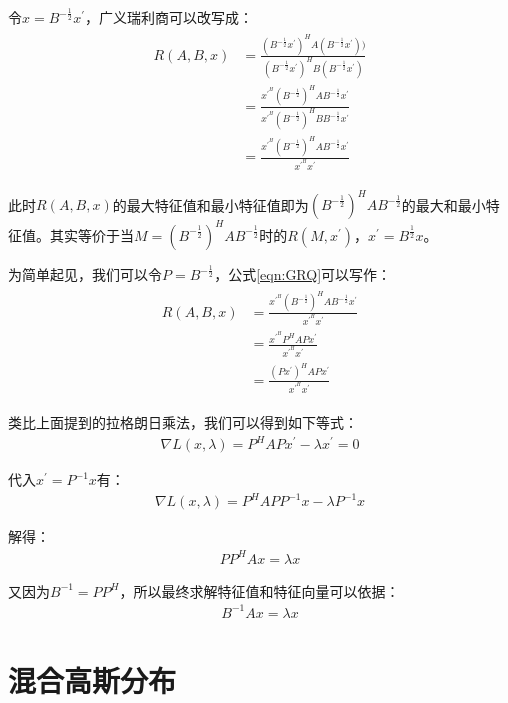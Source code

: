 令$x=B^{-\frac{1}{2}}x^{'}$，广义瑞利商可以改写成：
\begin{align}
\label{eqn:GRQ}
\begin{split}
R(A,B,x) &= \frac{(B^{-\frac{1}{2}}x^{'})^{H}A(B^{-\frac{1}{2}}x^{'}))}{(B^{-\frac{1}{2}}x^{'})^{H}B(B^{-\frac{1}{2}}x^{'})} \\
         &= \frac{x^{'}^{H}(B^{-\frac{1}{2}})^{H}AB^{-\frac{1}{2}}x^{'}}{x^{'}^{H}(B^{-\frac{1}{2}})^{H}BB^{-\frac{1}{2}}x^{'}}  \\
         &= \frac{x^{'}^{H}(B^{-\frac{1}{2}})^{H}AB^{-\frac{1}{2}}x^{'}}{x^{'}^{H}x^{'}}
\end{split}
\end{align}

此时$R(A,B,x)$的最大特征值和最小特征值即为$(B^{-\frac{1}{2}})^{H}AB^{-\frac{1}{2}}$的最大和最小特征值。其实等价于当$M=(B^{-\frac{1}{2}})^{H}AB^{-\frac{1}{2}}$时的$R(M,x^{'})$，$x^{'}=B^{\frac{1}{2}}x$。

为简单起见，我们可以令$P=B^{-\frac{1}{2}}$，公式\ref{eqn:GRQ}可以写作：
\begin{align}
\label{eqn:GRQ1}
\begin{split}
R(A,B,x) &= \frac{x^{'}^{H}(B^{-\frac{1}{2}})^{H}AB^{-\frac{1}{2}}x^{'}}{x^{'}^{H}x^{'}} \\
         &= \frac{x^{'}^{H}P^{H}APx^{'}}{x^{'}^{H}x^{'}}  \\
         &= \frac{(Px^{'})^{H}APx^{'}}{x^{'}^{H}x^{'}}
\end{split}
\end{align}

类比上面提到的拉格朗日乘法，我们可以得到如下等式：
\begin{align}
\nabla{L(x, \lambda)} = P^{H}APx^{'} - \lambda{x^{'}} = 0
\end{align}

代入$x^{'}=P^{-1}x$有：
\begin{align}
\nabla{L(x, \lambda)} = P^{H}APP^{-1}x - \lambda{P^{-1}x} 
\end{align}

解得：
\begin{align}
PP^{H}Ax=\lambda{x} 
\end{align}

又因为$B^{-1}=PP^{H}$，所以最终求解特征值和特征向量可以依据：
\begin{align}
B^{-1}Ax=\lambda{x}
\end{align}

\section{混合高斯分布}

